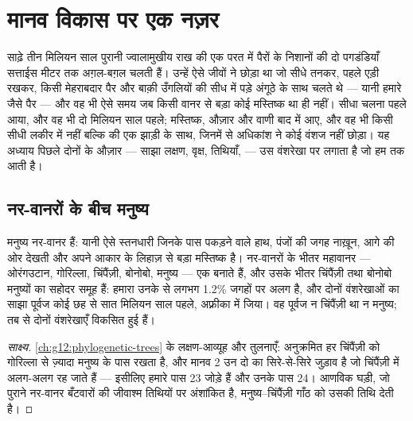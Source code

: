 \chapter{मानव विकास पर एक नज़र}\label{ch:g12:human-evolution}

साढ़े तीन मिलियन साल पुरानी ज्वालामुखीय राख की एक परत में पैरों के निशानों
की दो पगडंडियाँ सत्ताईस मीटर तक अग़ल-बग़ल चलती हैं। उन्हें ऐसे जीवों ने
छोड़ा था जो सीधे तनकर, पहले एड़ी रखकर, किसी मेहराबदार पैर और बाक़ी उँगलियों
की सीध में पड़े अंगूठे के साथ चलते थे --- यानी हमारे जैसे पैर --- और वह भी
ऐसे समय जब किसी वानर से बड़ा कोई मस्तिष्क था ही नहीं। सीधा चलना पहले आया,
और वह भी दो मिलियन साल पहले; मस्तिष्क, औज़ार और वाणी बाद में आए, और वह भी
किसी सीधी लकीर में नहीं बल्कि  की एक झाड़ी के साथ, जिनमें से
अधिकांश ने कोई वंशज नहीं छोड़ा। यह अध्याय पिछले दोनों के औज़ार --- साझा
लक्षण, वृक्ष, तिथियाँ,  --- उस वंशरेखा पर लगाता है जो हम तक आती है।

\section{नर-वानरों के बीच मनुष्य}

\begin{proposition}[वृक्ष में हमारी जगह]\label{prop:g12:human-evolution:place}
मनुष्य नर-वानर हैं: यानी ऐसे स्तनधारी जिनके पास पकड़ने वाले हाथ, पंजों की
जगह नाख़ून, आगे की ओर देखती  और अपने आकार के लिहाज़ से बड़ा मस्तिष्क
है। नर-वानरों के भीतर महावानर --- ओरंगउटान, गोरिल्ला, चिंपैंज़ी, बोनोबो,
मनुष्य --- एक  बनाते हैं, और उसके भीतर चिंपैंज़ी तथा बोनोबो मनुष्यों
का सहोदर समूह हैं: हमारा  उनके  से लगभग 1.2\% जगहों पर अलग है, और
दोनों वंशरेखाओं का साझा पूर्वज कोई छह से सात मिलियन साल पहले, अफ़्रीका में
जिया। वह पूर्वज न चिंपैंज़ी था न मनुष्य; तब से दोनों वंशरेखाएँ विकसित हुई
हैं।
\end{proposition}
\begin{proof}[साक्ष्य]
\cref{ch:g12:phylogenetic-trees} के लक्षण-आव्यूह और  तुलनाएँ:
अनुक्रमित हर  चिंपैंज़ी को गोरिल्ला से ज़्यादा मनुष्य के पास रखता है, और
मानव  2 उन दो  का सिरे-से-सिरे जुड़ाव है जो चिंपैंज़ी में
अलग-अलग रह जाते हैं --- इसीलिए हमारे पास 23 जोड़े हैं और उनके पास 24।
आणविक घड़ी, जो पुराने नर-वानर बँटवारों की जीवाश्म तिथियों पर अंशांकित है,
मनुष्य--चिंपैंज़ी गाँठ को उसकी तिथि देती है।
\end{proof}

